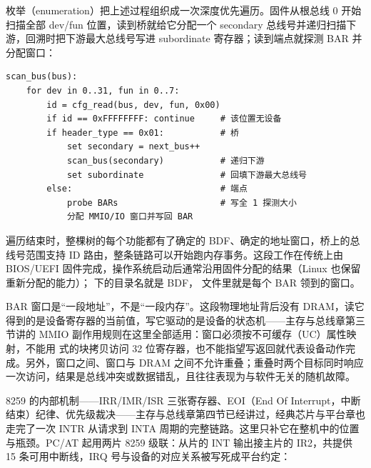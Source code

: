 枚举（enumeration）把上述过程组织成一次深度优先遍历。固件从根总线 0 开始扫描全部 dev/fun 位置，读到桥就给它分配一个 secondary 总线号并递归扫描下游，回溯时把下游最大总线号写进 subordinate 寄存器；读到端点就探测 BAR 并分配窗口：

\begin{lstlisting}
scan_bus(bus):
    for dev in 0..31, fun in 0..7:
        id = cfg_read(bus, dev, fun, 0x00)
        if id == 0xFFFFFFFF: continue     # 该位置无设备
        if header_type == 0x01:           # 桥
            set secondary = next_bus++
            scan_bus(secondary)           # 递归下游
            set subordinate               # 回填下游最大总线号
        else:                             # 端点
            probe BARs                    # 写全 1 探测大小
            分配 MMIO/IO 窗口并写回 BAR
\end{lstlisting}

遍历结束时，整棵树的每个功能都有了确定的 BDF、确定的地址窗口，桥上的总线号范围支持 ID 路由，整条链路可以开始跑内存事务。这段工作在传统上由 BIOS/UEFI 固件完成，操作系统启动后通常沿用固件分配的结果（Linux 也保留重新分配的能力）； 下的目录名就是 BDF， 文件里就是每个 BAR 领到的窗口。

\begin{warningbox}
BAR 窗口是“一段地址”，不是“一段内存”。这段物理地址背后没有 DRAM，读它得到的是设备寄存器的当前值，写它驱动的是设备的状态机——主存与总线章第三节讲的 MMIO 副作用规则在这里全部适用：窗口必须按不可缓存（UC）属性映射，不能用  式的块拷贝访问 32 位寄存器，也不能指望写返回就代表设备动作完成。另外，窗口之间、窗口与 DRAM 之间不允许重叠；重叠时两个目标同时响应一次访问，结果是总线冲突或数据错乱，且往往表现为与软件无关的随机故障。
\end{warningbox}


8259 的内部机制——IRR/IMR/ISR 三张寄存器、EOI（End Of Interrupt，中断结束）纪律、优先级裁决——主存与总线章第四节已经讲过，经典芯片与平台章也走完了一次 INTR 从请求到 INTA 周期的完整链路。这里只补它在整机中的位置与瓶颈。PC/AT 起用两片 8259 级联：从片的 INT 输出接主片的 IR2，共提供 15 条可用中断线，IRQ 号与设备的对应关系被写死成平台约定：

